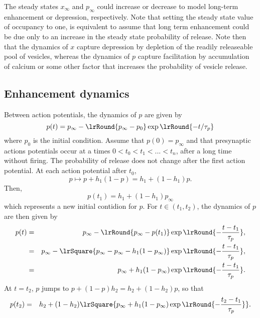 \documentclass[11pt,landscape]{article}
\begin{document}
The steady states $x_{\infty}$ and $p_{\infty}$ could increase or decrease to
model long-term enhancement or depression, respectively. Note that
setting the steady state value of occupancy to one, is equivalent to
assume that long term enhancement could be due only to an increase in
the steady state probability of release.  Note then that the dynamics
of $x$ capture depression by depletion of the readily releaseable pool
of vesicles, whereas the dynamics of $p$ capture facilitation by
accumulation of calcium or some other factor that increases the
probability of vesicle release. 


\subsection{Enhancement dynamics}

Between action potentials,
the dynamics of $p$ are given by
\begin{equation}
  p(t) = p_{\infty} - \lrRound{p_{\infty} - p_0} \exp \lrRound{-t/ \tau_p}
\end{equation} 
where $p_0$ is the initial condition.  Assume that $p(0)=p_{\infty}$ and
that presynaptic actions potentials occur at a times
$0<t_0<t_1<...<t_n$, after a long time without firing. The probability
of release does not change after the first action potential. At each
action potential after $t_0$, 
\begin{displaymath}
p \mapsto p+ h_1 (1-p)  = h_1 +
(1-h_1) p.
\end{displaymath}
Then,  
\begin{equation}
p(t_1)= h_1 + (1-h_1) p_{\infty}
\end{equation}
which represents a new initial contidion for $p$. For $t \in 
(t_1,t_2)$, the dynamics of $p$ are then given by
\begin{eqnarray}
p(t) 
&=&
p_{\infty} - \lrRound{p_{\infty} - p(t_1) }\exp
\lrRound{-\frac{t-t_1}{\tau_p}},
\\ 
&=& p_{\infty} - \lrSquare{p_{\infty} - p_{\infty} - h_1   (1-p_{\infty})}
\exp \lrRound{-\frac{t-t_1}{\tau_p}} ,
\\
&=& p_{\infty} + h_1   (1-p_{\infty})
\exp \lrRound{-\frac{t-t_1}{\tau_p}} .
\end{eqnarray}
At $t=t_2$, $p$ jumps to $p + (1-p)h_2 = h_2+
(1-h_2)p$, so that
\begin{eqnarray}
p(t_2)
&=&
h_2 
+ (1-h_2) \lrSquare{p_{\infty} + h_1 (1-p_{\infty}) 
\exp \lrRound{-\frac{t_2-t_1}{\tau_p}}}.
\end{eqnarray}
\end{document}
